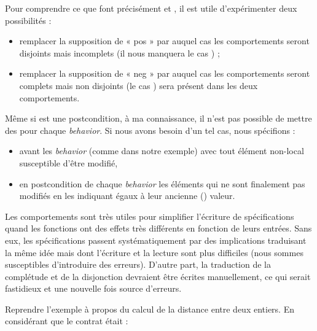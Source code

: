 Pour comprendre ce que font précisément  et , il est utile
d'expérimenter deux possibilités :



\begin{itemize}
\item remplacer la supposition de « pos » par  auquel cas les
comportements seront disjoints mais incomplets (il nous manquera le cas
) ;
\item remplacer la supposition de « neg » par  auquel cas les
comportements seront complets mais non disjoints (le cas ) sera
présent dans les deux comportements.
\end{itemize}


\begin{Warning}
Même si  est une postcondition, à ma connaissance, il n'est pas
possible de mettre des  pour chaque \textit{behavior}. Si nous avons
besoin d'un tel cas, nous spécifions :

\begin{itemize}
\item {} avant les \textit{behavior} (comme dans notre exemple) avec tout
élément non-local susceptible d'être modifié,
\item en postcondition de chaque \textit{behavior} les éléments qui ne sont finalement
pas modifiés en les indiquant égaux à leur ancienne () valeur.
\end{itemize}
\end{Warning}


Les comportements sont très utiles pour simplifier l'écriture de spécifications
quand les fonctions ont des effets très différents en fonction de leurs
entrées. Sans eux, les spécifications passent systématiquement par des
implications traduisant la même idée mais dont l'écriture et la lecture sont
plus difficiles (nous sommes susceptibles d'introduire des erreurs).
D'autre part, la traduction de la complétude et de la disjonction devraient
être écrites manuellement, ce qui serait fastidieux et une nouvelle fois source
d'erreurs.







Reprendre l'exemple à propos du calcul de la distance entre deux entiers.
En considérant que le contrat était :


